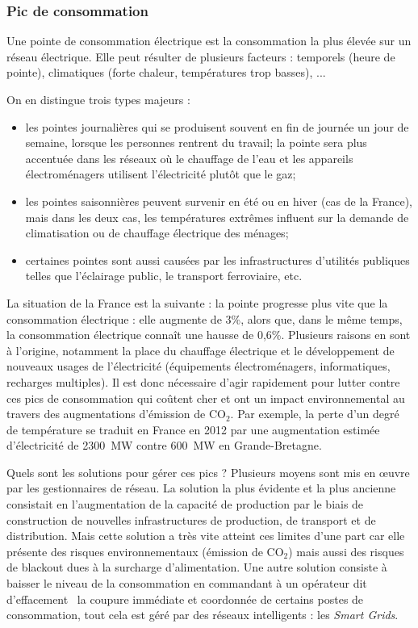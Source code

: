 		
		\subsubsection{Pic de consommation}
			Une pointe de consommation électrique est la consommation la plus élevée sur un réseau électrique. Elle peut résulter de plusieurs facteurs : temporels (heure de pointe), climatiques (forte chaleur, températures trop basses), ...
			
			On en distingue trois types majeurs :
			
			\begin{itemize}
				\item les pointes journalières qui se produisent souvent en fin de journée un jour de semaine, lorsque les personnes rentrent du travail; la pointe sera plus accentuée dans les réseaux où le chauffage de l'eau et les appareils électroménagers utilisent l'électricité plutôt que le gaz;
				\item les pointes saisonnières peuvent survenir en été ou en hiver (cas de la France), mais dans les deux cas, les températures extrêmes influent sur la demande de climatisation ou de chauffage électrique des ménages;
				\item certaines pointes sont aussi causées par les infrastructures d'utilités publiques telles que l'éclairage public, le transport ferroviaire, etc.
			\end{itemize}
			
			La situation de la France est la suivante : la pointe progresse  plus vite que la consommation électrique : elle augmente de 3\%, alors que, dans le même temps, la consommation électrique connaît une hausse de 0,6\%. Plusieurs raisons en sont à l'origine, notamment la place du chauffage électrique et le développement de nouveaux usages de l'électricité (équipements électroménagers, informatiques, recharges multiples). Il est donc nécessaire d'agir rapidement pour lutter contre ces pics de consommation qui coûtent cher et ont un impact environnemental au travers des augmentations d'émission de CO$_2$.
			Par exemple, la perte d'un degré de température se traduit en France en 2012 par une augmentation estimée d'électricité de 2300~MW contre 600~MW en Grande-Bretagne.
			
			Quels sont les solutions pour gérer ces pics ? Plusieurs moyens sont mis en œuvre par les gestionnaires de réseau.
			La solution la plus évidente et la plus ancienne consistait en l'augmentation de la capacité de production par le biais de construction de nouvelles infrastructures de production, de transport et de distribution. Mais cette solution a très vite atteint ces limites d'une part car elle présente des risques environnementaux (émission de CO$_2$) mais aussi des risques de blackout dues à la surcharge d'alimentation.
			Une autre solution consiste à baisser le niveau de la consommation en commandant à un opérateur dit \og d'effacement \fg~la coupure immédiate et coordonnée de certains postes de consommation, tout cela est géré par des réseaux intelligents : les \textit{Smart Grids}.
		
